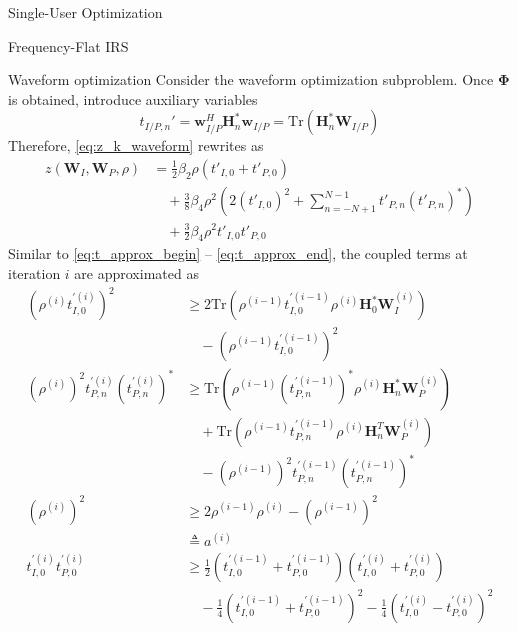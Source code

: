\documentclass{IEEEtran}
\begin{document}
\begin{section}{Single-User Optimization}
\begin{subsection}{Frequency-Flat IRS}
		\begin{subsubsection}{Waveform optimization}
			Consider the waveform optimization subproblem. Once $\boldsymbol{\Phi}$ is obtained, introduce auxiliary variables
			\begin{equation}\label{eq:t'}
				t_{I/P,n}' = \boldsymbol{w}_{I/P}^H \boldsymbol{H}_n^* \boldsymbol{w}_{I/P} = \mathrm{Tr}(\boldsymbol{H}_n^*\boldsymbol{W}_{I/P})
			\end{equation}
			Therefore, \ref{eq:z_k_waveform} rewrites as
			\begin{equation}\label{eq:z_waveform}
				\begin{split}
					z(\boldsymbol{W}_I,\boldsymbol{W}_P,\rho)
					&=\frac{1}{2} \beta_2 \rho (t'_{I,0}+t'_{P,0})\\
					&\quad+\frac{3}{8} \beta_4 \rho^2 \left(2(t'_{I,0})^2 + \sum_{n=-N+1}^{N-1}{t'_{P,n}(t'_{P,n})^*}\right)\\
					&\quad+\frac{3}{2} \beta_4 \rho^2 t'_{I,0}t'_{P,0}
				\end{split}
			\end{equation}
			Similar to \ref{eq:t_approx_begin} -- \ref{eq:t_approx_end}, the coupled terms at iteration $i$ are approximated as
			\begin{align}
				(\rho^{(i)} t_{I,0}^{\prime (i)})^2
				& \ge 2 \mathrm{Tr}\left(\rho^{(i-1)}t_{I,0}^{\prime (i-1)}\rho^{(i)}\boldsymbol{H}_{0}^*\boldsymbol{W}_{I}^{(i)}\right)\nonumber\\
				& \quad - (\rho^{(i-1)}t_{I,0}^{\prime (i-1)})^2\\
				(\rho^{(i)})^2 t_{P,n}^{\prime (i)} (t_{P,n}^{\prime (i)})^*
				& \ge \mathrm{Tr}\left(\rho^{(i-1)}(t_{P,n}^{\prime (i-1)})^*\rho^{(i)}\boldsymbol{H}_{n}^*\boldsymbol{W}_{P}^{(i)}\right)\nonumber\\
				& \quad + \mathrm{Tr}\left(\rho^{(i-1)}t_{P,n}^{\prime (i-1)}\rho^{(i)}\boldsymbol{H}_{n}^T\boldsymbol{W}_{P}^{(i)}\right)\nonumber\\
				& \quad - (\rho^{(i-1)})^2 t_{P,n}^{\prime (i-1)} (t_{P,n}^{\prime (i-1)})^*\\
				(\rho^{(i)})^2
				& \ge 2\rho^{(i-1)}\rho^{(i)} - (\rho^{(i-1)})^2\nonumber\\
				& \triangleq a^{(i)}\label{eq:a}\\
				t_{I,0}^{\prime (i)} t_{P,0}^{\prime (i)}
				& \ge \frac{1}{2} (t_{I,0}^{\prime (i-1)} + t_{P,0}^{\prime (i-1)})(t_{I,0}^{\prime (i)} + t_{P,0}^{\prime (i)})\nonumber\\
				& \quad - \frac{1}{4}(t_{I,0}^{\prime (i-1)}+t_{P,0}^{\prime (i-1)})^2 - \frac{1}{4}(t_{I,0}^{\prime (i)} - t_{P,0}^{\prime (i)})^2\nonumber\\

\end{align}
\end{subsubsection}
\end{subsection}
\end{section}
\end{document}

